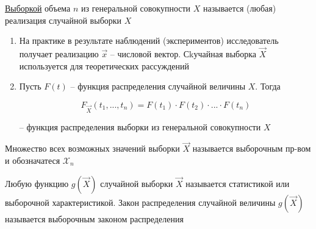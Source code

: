\begin{defenition}
    \underline{Выборкой} объема $n$ из генеральной совокупности $X$
    называется (любая) реализация случайной выборки $X$
\end{defenition}

\begin{note}
    \begin{enumerate}
        \item На практике в результате наблюдений (экспериментов)
            исследователь получает реализацию $\vec x$ -- числовой
            вектор. Сkучайная выборка $\vec X$ используется для
            теоретических рассуждений
        \item Пусть $F(t)$ -- функция распределения случайной
            величины $X$. Тогда

             \begin{equation*}
                F_{\vec X} (t_1, ..., t_n) =
                F(t_1) \cdot F(t_2) \cdot ... \cdot F(t_n)
            \end{equation*}

            -- функция распределения выборки из генеральной
            совокупности $X$
    \end{enumerate}
\end{note}

\begin{defenition}
    Множество всех возможных значений выборки $\vec X$ называется
    выборочным пр-вом и обозначатеся $\mathcal X_n$
\end{defenition}

\begin{defenition}
    Любую функцию $g(\vec X)$ случайной выборки $\vec X$ называется
    статистикой или выборочной характеристикой. Закон распределения
    случайной величины $g(\vec X)$ называется выборочным законом
    распределения
\end{defenition}

